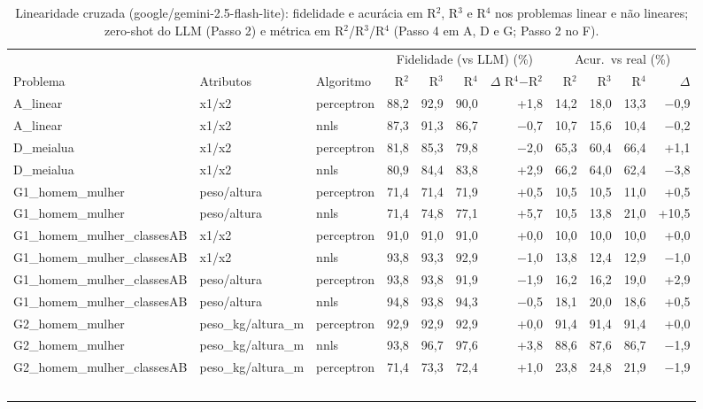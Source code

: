 \begin{table}[htbp]
\centering
\footnotesize
\caption{Linearidade cruzada (google/gemini-2.5-flash-lite): fidelidade e acurácia em R$^2$, R$^3$ e R$^4$ nos problemas linear e não lineares; zero-shot do LLM (Passo 2) e métrica em R$^2$/R$^3$/R$^4$ (Passo 4 em A, D e G; Passo 2 no F).}
\label{tab:final_linearidade_cruzada_R2_R3_R4_flashlite}
\begin{tabular}{lllrrrrrrrr}
\toprule
 &  &  & \multicolumn{4}{c}{Fidelidade (vs LLM) (\%)} & \multicolumn{4}{c}{Acur.\ vs real (\%)} \\ \cmidrule(lr){4-7} \cmidrule(lr){8-11}
Problema & Atributos & Algoritmo & R$^2$ & R$^3$ & R$^4$ & $\Delta$ R$^4$$-$R$^2$ & R$^2$ & R$^3$ & R$^4$ & $\Delta$ \\
\midrule
A\_linear & x1/x2 & perceptron & 88,2 & 92,9 & 90,0 & +1,8 & 14,2 & 18,0 & 13,3 & $-$0,9 \\
A\_linear & x1/x2 & nnls & 87,3 & 91,3 & 86,7 & $-$0,7 & 10,7 & 15,6 & 10,4 & $-$0,2 \\
\midrule
D\_meialua & x1/x2 & perceptron & 81,8 & 85,3 & 79,8 & $-$2,0 & 65,3 & 60,4 & 66,4 & +1,1 \\
D\_meialua & x1/x2 & nnls & 80,9 & 84,4 & 83,8 & +2,9 & 66,2 & 64,0 & 62,4 & $-$3,8 \\
\midrule
G1\_homem\_mulher & peso/altura & perceptron & 71,4 & 71,4 & 71,9 & +0,5 & 10,5 & 10,5 & 11,0 & +0,5 \\
G1\_homem\_mulher & peso/altura & nnls & 71,4 & 74,8 & 77,1 & +5,7 & 10,5 & 13,8 & 21,0 & +10,5 \\
\midrule
G1\_homem\_mulher\_classesAB & x1/x2 & perceptron & 91,0 & 91,0 & 91,0 & +0,0 & 10,0 & 10,0 & 10,0 & +0,0 \\
G1\_homem\_mulher\_classesAB & x1/x2 & nnls & 93,8 & 93,3 & 92,9 & $-$1,0 & 13,8 & 12,4 & 12,9 & $-$1,0 \\
G1\_homem\_mulher\_classesAB & peso/altura & perceptron & 93,8 & 93,8 & 91,9 & $-$1,9 & 16,2 & 16,2 & 19,0 & +2,9 \\
G1\_homem\_mulher\_classesAB & peso/altura & nnls & 94,8 & 93,8 & 94,3 & $-$0,5 & 18,1 & 20,0 & 18,6 & +0,5 \\
\midrule
G2\_homem\_mulher & peso\_kg/altura\_m & perceptron & 92,9 & 92,9 & 92,9 & +0,0 & 91,4 & 91,4 & 91,4 & +0,0 \\
G2\_homem\_mulher & peso\_kg/altura\_m & nnls & 93,8 & 96,7 & 97,6 & +3,8 & 88,6 & 87,6 & 86,7 & $-$1,9 \\
\midrule
G2\_homem\_mulher\_classesAB & peso\_kg/altura\_m & perceptron & 71,4 & 73,3 & 72,4 & +1,0 & 23,8 & 24,8 & 21,9 & $-$1,9 \\
$$
\end{tabular}
\end{table}
